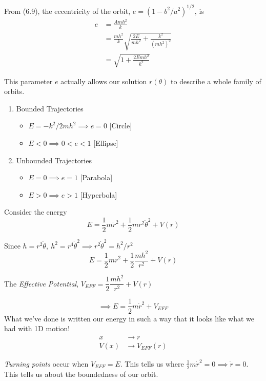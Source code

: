 \documentclass[10pt]{scrartcl}
\begin{document}
From (6.9), the eccentricity of the orbit, $e = (1-b^2/a^2)^{1/2}$, is
\[
\begin{aligned}
e &= \frac{Amh^2}{k}\\ 
&= \frac{mh^2}{k}\sqrt{\frac{2E}{mh^2} + \frac{k^2}{(mh^2)^2} }\\
&= \sqrt{1 + \frac{2Emh^2}{k^2}}	
\end{aligned}
\]
	

This parameter $e$ actually allows our solution $r(\theta)$ to describe a whole family of orbits. 
\begin{examples}
\begin{enumerate}
\item Bounded Trajectories
\begin{itemize}
\item $E = -k^2/2mh^2 \implies e = 0$ [Circle] 	
\item $E < 0 \implies 0 < e < 1$ [Ellipse]
\end{itemize}

\item Unbounded Trajectories
\begin{itemize}
\item $E = 0 \implies e = 1$ [Parabola]
\item $E > 0 \implies e > 1$ [Hyperbola]	
\end{itemize}

\end{enumerate}
\end{examples}


Consider  the energy 
\[E = \frac{1}{2}m\dot{r}^2 + \frac{1}{2}mr^2\dot{\theta}^2 + V(r)\]

Since $h = r^2\dot{\theta},~ h^2 = r^4\dot{\theta}^2 \implies r^2\dot{\theta}^2 = h^2/r^2$
\[E = \frac{1}{2}m\dot{r}^2 + \frac{1}{2}\frac{mh^2}{r^2} + V(r)\]

\begin{definition}
The \emph{Effective Potential}, $V_{EFF} =\dfrac{1}{2}\dfrac{mh^2}{r^2} + V(r)$	
\end{definition}
\[\implies E = \frac{1}{2}m\dot{r}^2 + V_{EFF}\]
What we've done is written our energy in such a way that it looks like what we had with 1D motion! 
\[\begin{aligned}x &\longrightarrow r \\
V(x) &\longrightarrow V_{EFF}(r)
\end{aligned}
\]

\begin{definition} \emph{Turning points} occur when $V_{EFF} = E$. This tells us where $\frac{1}{2}m\dot{r}^2 = 0 \implies \dot{r} = 0$. This tells us about the boundedness of our orbit. 

\end{definition}
\end{document}
